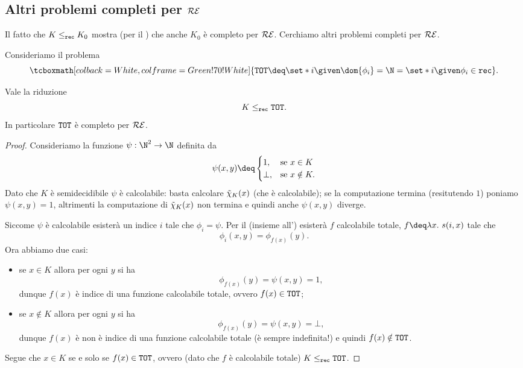 \subsection{Altri problemi completi per $\mathcal{RE}$}

Il fatto che $K \leq_{\texttt{rec}} K_0$ mostra (per il ) che anche $K_0$ è completo per $\mathcal{RE}$. Cerchiamo altri problemi completi per $\mathcal{RE}$.


Consideriamo il problema \[
    \tcboxmath[colback=White, colframe=Green!70!White]{\TOT \deq \set*{i \given \dom{\phi_i} = \N} = \set*{i \given \phi_i \in \rec}}.
\]

\begin{proposition}
    Vale la riduzione \[
        K \leq_{\texttt{rec}} \texttt{TOT}.
    \] In particolare $\texttt{TOT}$ è completo per $\mathcal{RE}$. 
\end{proposition}
\begin{proof}
    Consideriamo la funzione $\psi : \N^2 \to \N$ definita da \[
        \psi(x, y) \deq \begin{cases}
            1, &\text{se } x \in K \\
            \bot, &\text{se } x \notin K.
        \end{cases}
    \] Dato che $K$ è semidecidibile $\psi$ è calcolabile: basta calcolare $\tilde{\chi}_{K}(x)$ (che è calcolabile); se la computazione termina (resitutendo $1$) poniamo $\psi(x, y) = 1$, altrimenti la computazione di $\tilde{\chi}_{K}(x)$ non termina e quindi anche $\psi(x, y)$ diverge.

    Siccome $\psi$ è calcolabile esisterà un indice $i$ tale che $\phi_i = \psi$. Per il  (insieme all') esisterà $f$ calcolabile totale, $f \deq \lam{x}{s(i, x)}$ tale che \[
        \phi_i(x, y) = \phi_{f(x)}(y).
    \] Ora abbiamo due casi: \begin{itemize}
        \item se $x \in K$ allora per ogni $y$ si ha \[
            \phi_{f(x)}(y) = \psi(x, y) = 1,
        \] dunque $f(x)$ è indice di una funzione calcolabile totale, ovvero $f(x) \in \texttt{TOT}$;
        \item se $x \notin K$ allora per ogni $y$ si ha \[
            \phi_{f(x)}(y) = \psi(x, y) = \bot,
        \] dunque $f(x)$ è non è indice di una funzione calcolabile totale (è sempre indefinita!) e quindi $f(x) \notin \texttt{TOT}$.   
    \end{itemize}

    Segue che $x \in K$ se e solo se $f(x) \in \texttt{TOT}$, ovvero (dato che $f$ è calcolabile totale) $K \leq_{\texttt{rec}} \texttt{TOT}$.  
\end{proof}
